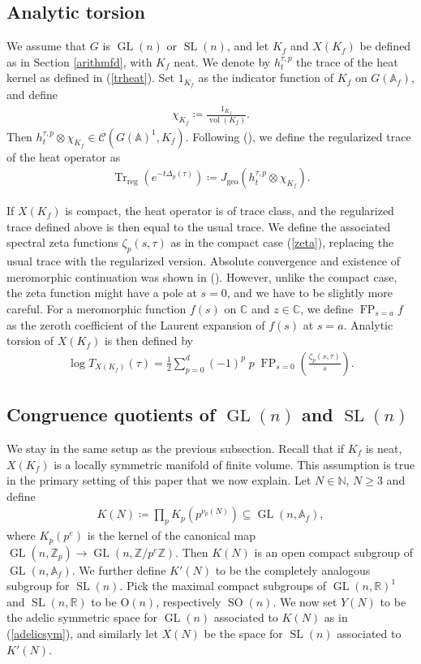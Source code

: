 \documentclass[11pt,reqno]{amsart}
\numberwithin{equation}{section}
\theoremstyle{definition}
\theoremstyle{remark}
\newcommand{\N}{\mathbb{N}}
\newcommand{\GL}{\operatorname{GL}}
\newcommand{\SL}{\operatorname{SL}}
\newcommand{\SO}{\operatorname{SO}}
\newcommand{\Trreg}{\operatorname{Tr}_{\operatorname{reg}}}
\newcommand{\vol}{\operatorname{vol}}
\newcommand{\geo}{\operatorname{geo}}
\newcommand{\FP}{\operatorname{FP}}
\newcommand{\A}{\mathbb{A}}
\newcommand{\C}{\mathbb{C}}
\newcommand{\Z}{\mathbb{Z}}
\newcommand{\R}{\mathbb{R}}
\renewcommand{\subset}{\subseteq}
\begin{document}
\subsection*{Analytic torsion}\label{analytictorsionsection} We assume that $G$ is $\GL(n)$ or $\SL(n)$, and let $K_f$ and $X(K_f)$ be defined as in Section \ref{arithmfd}, with $K_f$ neat. We denote by $h_t^{\tau,p}$ the trace of the heat kernel as defined in (\ref{trheat}). Set $1_{K_f}$ as the indicator function of $K_f$ on $G(\A_f)$, and define
\begin{align*}
    \chi_{K_f}\coloneqq\frac{1_{K_f}}{\vol(K_f)}.
\end{align*} Then $h_t^{\tau,p}\otimes \chi_{K_f}\in \mathcal{C}(G(\A)^1,K_f)$. Following (\cite{MzM1}), we define the regularized trace of the heat operator as
\begin{align*}
    \Trreg\left(e^{-t\Delta_p(\tau)}\right)\coloneqq J_{\geo}\left(h_t^{\tau,p}\otimes \chi_{K_f}\right).
\end{align*}

\noindent If $X(K_f)$ is compact, the heat operator is of trace class, and the regularized trace defined above is then equal to the usual trace. We define the associated spectral zeta functions $\zeta_p(s,\tau)$ as in the compact case (\ref{zeta}), replacing the usual trace with the regularized version. Absolute convergence and existence of meromorphic continuation was shown in (\cite{MzM1}). However, unlike the compact case, the zeta function might have a pole at $s=0$, and we have to be slightly more careful. For a meromorphic function $f(s)$ on $\C$ and $z\in \C$, we define $\FP_{s=a}f$ as the zeroth coefficient of the Laurent expansion of $f(s)$ at $s=a$. Analytic torsion of $X(K_f)$ is then defined by
\begin{align}\label{torsion}
    \log T_{X(K_f)}(\tau) = \frac12\sum_{p=0}^d(-1)^p\;p\; \FP_{s=0}\left(\frac{\zeta_p(s,\tau)}{s}\right).
\end{align}

\subsection*{Congruence quotients of $\GL(n)$ and $\SL(n)$}\label{congquot}

We stay in the same setup as the previous subsection. Recall that if $K_f$ is neat, $X(K_f)$ is a locally symmetric manifold of finite volume. This assumption is true in the primary setting of this paper that we now explain. Let $N\in\N$, $N\geq 3$ and define 
\begin{align}\label{glnprincipalcongruencesubgroup}
    K(N)\coloneqq\prod_p K_p\left(p^{\nu_p(N)}\right) \subset \GL(n,\A_f),
\end{align}
where $K_p(p^e)$ is the kernel of the canonical map $\GL(n,\Z_p)\to \GL(n,\Z/p^e\Z)$. Then $K(N)$ is an open compact subgroup of $\GL(n,\A_f)$. We further define $K'(N)$ to be the completely analogous subgroup for $\SL(n)$. Pick the maximal compact subgroups of $\GL(n,\R)^1$ and $\SL(n,\R)$ to be $\text{O}(n)$, respectively $\SO(n)$. We now set $Y(N)$ to be the adelic symmetric space for $\GL(n)$ associated to $K(N)$ as in (\ref{adelicsym}), and similarly let $X(N)$ be the space for $\SL(n)$ associated to $K'(N)$.
\end{document}
